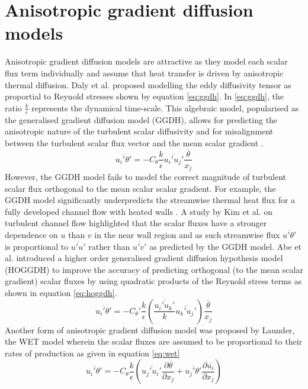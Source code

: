 \section{Anisotropic gradient diffusion models}
Anisotropic gradient diffusion models are attractive as they model each scalar flux term individually and assume that heat transfer is driven by anisotropic thermal diffusion. Daly et al. \cite{Daly1970} proposed modelling the eddy diffusivity tensor as proportial to Reynold stresses shown by equation \ref{eq:ggdh}. In \ref{eq:ggdh}, the ratio $\frac{k}{\epsilon}$ represents the dynamical time-scale. This algebraic model, popularised as the generalised gradient diffusion model (GGDH), allows for predicting the anisotropic nature of the turbulent scalar diffusivity and for misalignment between the turbulent scalar flux vector and the mean scalar gradient \cite{Younis2005}.  
\begin{equation}
\label{eq:ggdh}
\overline{u_{i}'\theta'} = -C_{\theta}\frac{k}{\epsilon}\overline{u_{i}'u_{j}'}\frac{\overline{\theta}}{x_{j}}
\end{equation}
However, the GGDH model fails to model the correct magnitude of turbulent scalar flux orthogonal to the mean scalar scalar gradient. For example, the GGDH model significantly underpredicts the streamwise thermal heat flux for a fully developed channel flow with heated walls \cite{Younis2005}. A study by Kim et al. \cite{Kim1987} on turbulent channel flow highlighted that the scalar fluxes have a stronger dependence on $u$ than $v$ in the near wall region and as such streamwise flux $\overline{u'\theta'}$ is  proportional to $\overline{u'u'}$ rather than $\overline{u'v'}$ as predicted by the GGDH model. Abe et al. \citep{Abe2001} introduced a higher order generalised gradient diffusion hypothesis model (HOGGDH) to improve the accuracy of predicting orthogonal (to the mean scalar gradient) scalar fluxes by using quadratic products of the Reynold stress terms as shown in equation \ref{eq:hoggdh}.  
\begin{equation}
\label{eq:hoggdh}
\overline{u_{i}'\theta'} = -C_{\theta}'\frac{k}{\epsilon}\left(\frac{\overline{u_{i}'u_{k}'}}{k} \overline{u_{k}'u_{j}'}\right)\frac{\overline{\theta}}{x_{j}}
\end{equation}
Another form of anisotropic gradient diffusion model was proposed by Launder, the WET model wherein the scalar fluxes are assumed to be proportional to their rates of production as given in equation \ref{eq:wet}
\begin{equation}
\label{eq:wet}
\overline{u_{i}'\theta'} = -C_{\theta}\frac{k}{\epsilon}\left(\overline{u_{j}'u_{i}'}\frac{\partial \overline{\theta}}{\partial x_{j}} + \overline{u_{j}'\theta'}\frac{\partial \overline{u_{i}}}{\partial x_{j}} \right)
\end{equation} 

